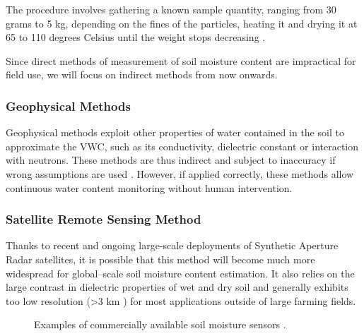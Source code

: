 The procedure involves gathering a known sample quantity, ranging from 30 grams to 5 kg, depending on the fines of the particles, heating it and drying it at 65 to 110 degrees Celsius until the weight stops decreasing \cite{department_of_sustainable_natural_resources_soil_2024,myjove_corporation_determination_2024, paul_soil_2007}.

Since direct methods of measurement of soil moisture content are impractical for field use, we will focus on indirect methods from now onwards.

\subsubsection{Geophysical Methods}
Geophysical methods exploit other properties of water contained in the soil to approximate the VWC, such as its conductivity, dielectric constant or interaction with neutrons. These methods are thus indirect and subject to inaccuracy if wrong assumptions are used \cite{webster_humidity_1998}. However, if applied correctly, these methods allow continuous water content monitoring without human intervention.

\subsubsection{Satellite Remote Sensing Method}
Thanks to recent and ongoing large-scale deployments of Synthetic Aperture Radar satellites, it is possible that this method will become much more widespread for global--scale soil moisture content estimation. It also relies on the large contrast in dielectric properties of wet and dry soil and generally exhibits too low resolution (>3 km \cite{podest_applications_nodate,eos_data_analytics_remote_2022}) for most applications outside of large farming fields.

\begin{figure}
    \hfil
    \caption{\label{fig:satellite}Examples of commercially available soil moisture sensors \cite{meter_group_teros_nodate, baseline_soil_2021, czechproject_spol_sro_pudni_2024}.}
\end{figure}

